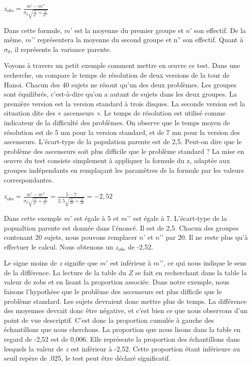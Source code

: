 \documentclass[]{book}
\theoremstyle{definition}
\theoremstyle{definition}
\theoremstyle{definition}
\theoremstyle{remark}
\begin{document}
\(z_{obs}= \frac{m{}'-m{}''}{\sigma_{0}\sqrt{\frac{1}{n{}'}+\frac{1}{n{}''}}}\)

Dans cette formule, \(m{}’\) est la moyenne du premier groupe et
\(n{}’\) son effectif. De la même, \(m{}’’\) représentera la moyenne du
second groupe et n'' son effectif. Quant à \(\sigma_{0}\), il représente
la variance parente.

Voyons à travers un petit exemple comment mettre en œuvre ce test. Dans
une recherche, on compare le temps de résolution de deux versions de la
tour de Hanoi. Chacun des 40 sujets ne résout qu'un des deux problèmes.
Les groupes sont équilibrés, c'est-à-dire qu'on a autant de sujets dans
les deux groupes. La première version est la version standard à trois
disques. La seconde version est la situation dite des « ascenseurs ». Le
temps de résolution est utilisé comme indicateur de la difficulté des
problèmes. On observe que le temps moyen de résolution est de 5 mn pour
la version standard, et de 7 mn pour la version des ascenseurs.
L'écart-type de la population parente est de 2,5. Peut-on dire que le
problème des ascenseurs soit plus difficile que le problème standard ?
La mise en œuvre du test consiste simplement à appliquer la formule du
z, adaptée aux groupes indépendants en remplaçant les paramètres de la
formule par les valeurs correspondantes.

\(z_{obs} = \frac{m{}'-m{}''}{\sigma _{0}\sqrt{\frac{1}{n{}'}+\frac{1}{n{}''}}} = \frac{5-7}{2,5\sqrt{\frac{1}{20}+\frac{1}{20}}} = -2,52\)

Dans cette exemple \(m{}’\) est égale à 5 et \(m{}’'\) est égale à 7.
L'écart-type de la popualtion parente est donnée dans l'énoncé. Il est
de 2,5. Chacun des groupes contenant 20 sujets, nous pouvons remplacer
\(n{}’\) et \(n{}'’\) par 20. Il ne reste plus qu'à effectuer le calcul.
Nous obtenons un \(z_{obs}\) de -2,52.

Le signe moins de \(z\) signifie que \(m{}’\) est inférieur à \(m{}’'\),
ce qui nous indique le sens de la différence. La lecture de la table du
\(Z\) se fait en recherchant dans la table la valeur de zobs et en
lisant la proportion associée. Dans notre exemple, nous faisons
l'hypothèse que le problème des ascenseurs est plus difficile que le
problème standard. Les sujets devraient donc mettre plus de temps. La
différence des moyennes devrait donc être négative, et c'est bien ce que
nous observons d'un point de vue descriptif. C'est donc la proportion
cumulée à gauche des échantillons que nous cherchons. La proportion que
nous lisons dans la table en regard de -2,52 est de 0,006. Elle
représente la proportion des échantillons dans lesquels la valeur de
\(z\) est inférieur à -2,52. Cette proportion étant inférieure au seuil
repère de .025, le test peut être déclaré significatif.
\end{document}

